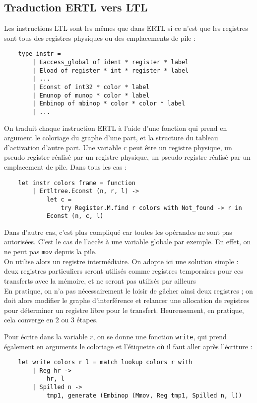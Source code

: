\documentclass{cours}
\begin{document}
\subsection{Traduction ERTL vers LTL}
Les instructions LTL sont les mêmes que dans ERTL si ce n'est que les registres sont tous des registres physiques ou des emplacements de pile : 
\begin{verbatim}
    type instr =
        | Eaccess_global of ident * register * label
        | Eload of register * int * register * label
        | ...
        | Econst of int32 * color * label
        | Emunop of munop * color * label
        | Embinop of mbinop * color * color * label
        | ...
\end{verbatim}
On traduit chaque instruction ERTL à l'aide d'une fonction qui prend en argument le coloriage du graphe d'une part, et la structure du tableau d'activation d'autre part.
Une variable $r$ peut être un registre physique, un pseudo registre réalisé par un registre physique, un pseudo-registre réalisé par un emplacement de pile. Dans tous les cas : 
\begin{verbatim}
    let instr colors frame = function
        | Ertltree.Econst (n, r, l) ->
            let c =
                try Register.M.find r colors with Not_found -> r in
            Econst (n, c, l)
\end{verbatim}
Dans d'autre cas, c'est plus compliqué car toutes les opérandes ne sont pas autorisées. C'est le cas de l'accès à une variable globale par exemple. En effet, on ne peut pas \texttt{mov} depuis la pile.\\
On utilise alors un registre intermédiaire. On adopte ici une solution simple : deux registres particuliers seront utilisés comme registres temporaires pour ces transferts avec la mémoire, et ne seront pas utilisés par ailleurs\\
En pratique, on n'a pas nécessairement le loisir de gâcher ainsi deux registres ; on doit alors modifier le graphe d'interférence et relancer une allocation de registres pour déterminer un registre libre pour le transfert. Heureusement, en pratique, cela converge en $2$ ou $3$ étapes. 

Pour écrire dans la variable $r$, on se donne une fonction \texttt{write}, qui prend également en arguments le coloriage et l'étiquette où il faut aller après l'écriture : 
\begin{verbatim}
    let write colors r l = match lookup colors r with
        | Reg hr ->
            hr, l
        | Spilled n ->
            tmp1, generate (Embinop (Mmov, Reg tmp1, Spilled n, l))
\end{verbatim}
\end{document}
